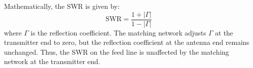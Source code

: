 Mathematically, the SWR is given by:
\[
\text{SWR} = \frac{1 + |\Gamma|}{1 - |\Gamma|}
\]
where \(\Gamma\) is the reflection coefficient. The matching network adjusts \(\Gamma\) at the transmitter end to zero, but the reflection coefficient at the antenna end remains unchanged. Thus, the SWR on the feed line is unaffected by the matching network at the transmitter end.

